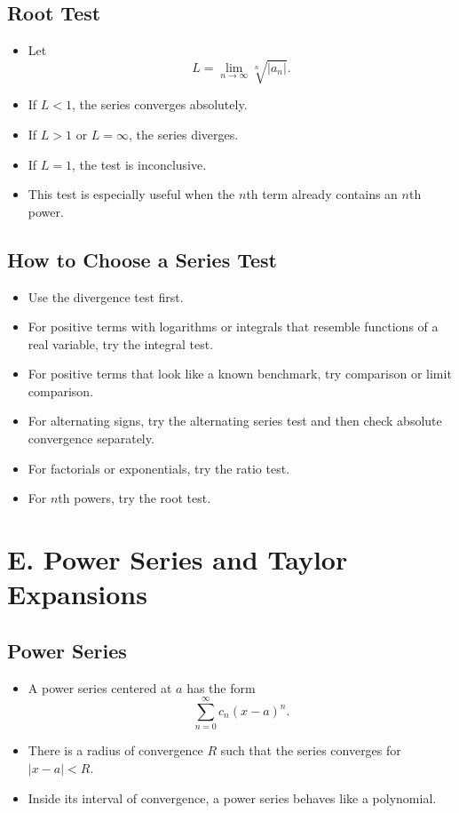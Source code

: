 \documentclass[11pt]{article}
\begin{document}
\subsection{Root Test}
\begin{itemize}
  \item Let
  \[
  L=\lim_{n\to\infty}\sqrt[n]{|a_n|}.
  \]
  \item If $L<1$, the series converges absolutely.
  \item If $L>1$ or $L=\infty$, the series diverges.
  \item If $L=1$, the test is inconclusive.
  \item This test is especially useful when the $n$th term already contains an $n$th power.
\end{itemize}

\subsection{How to Choose a Series Test}
\begin{itemize}
  \item Use the divergence test first.
  \item For positive terms with logarithms or integrals that resemble functions of a real variable, try the integral test.
  \item For positive terms that look like a known benchmark, try comparison or limit comparison.
  \item For alternating signs, try the alternating series test and then check absolute convergence separately.
  \item For factorials or exponentials, try the ratio test.
  \item For $n$th powers, try the root test.
\end{itemize}

\section{E. Power Series and Taylor Expansions}

\subsection{Power Series}
\begin{itemize}
  \item A power series centered at $a$ has the form
  \[
  \sum_{n=0}^\infty c_n(x-a)^n.
  \]
  \item There is a radius of convergence $R$ such that the series converges for $|x-a|<R$.
  \item Inside its interval of convergence, a power series behaves like a polynomial.
\end{itemize}
\end{document}
